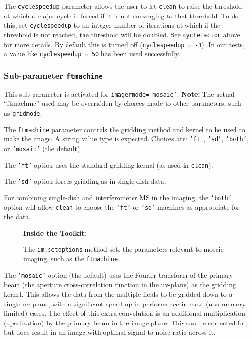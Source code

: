 The {\tt cyclespeedup} parameter allows the user to let {\tt clean}
to raise the threshold at which a major cycle is forced if it is not
converging to that threshold.  To do this, set {\tt cyclespeedup} to
an integer number of iterations at which if the threshold is not reached,
the threshold will be doubled.  See {\tt cyclefactor} above for more
details.  By default this is turned off ({\tt cyclespeedup = -1}).
In our tests, a value like {\tt cyclespeedup = 50} has been used successfully.

\subsubsection{Sub-parameter {\tt ftmachine} }
\label{section:im.imagermode.mosaic.ftmachine}

This sub-parameter is activated for {\tt imagermode='mosaic'}. 
{\bf Note:} The actual ``ftmachine'' used may be overridden by choices
made to other parameters, such as {\tt gridmode}.

The {\tt ftmachine} parameter controls the gridding method and kernel to be
used to make the image.  A string value type is expected.
Choices are: {\tt 'ft'}, {\tt 'sd'}, {\tt 'both'}, or {\tt 'mosaic'} (the default).

The {\tt 'ft'} option uses the standard gridding kernel (as used in 
{\tt clean}).

The {\tt 'sd'} option forces gridding as in single-dish data.

For combining single-dish and interferometer MS in the imaging, the
{\tt 'both'} option will allow {\tt clean} to choose the {\tt `ft'}
or {\tt 'sd'} machines as appropriate for the data.

\begin{wrapfigure}{r}{2.5in}
  \begin{boxedminipage}{2.5in}
     \centerline{\bf Inside the Toolkit:}
     The {\tt im.setoptions} method sets the parameters relevant to
     mosaic imaging, such as the {\tt ftmachine}.
  \end{boxedminipage}
\end{wrapfigure}

The {\tt 'mosaic'} option (the default) uses the Fourier transform of the
primary beam (the aperture cross-correlation function in the uv-plane) as
the gridding kernel.  This allows the data from the multiple fields to be
gridded down to a single uv-plane, with a significant speed-up in 
performance in most (non-memory limited) cases.  The effect of this extra
convolution is an additional multiplication (apodization) by the primary
beam in the image plane.  This can be corrected for, but does result in
an image with optimal signal to noise ratio across it.

